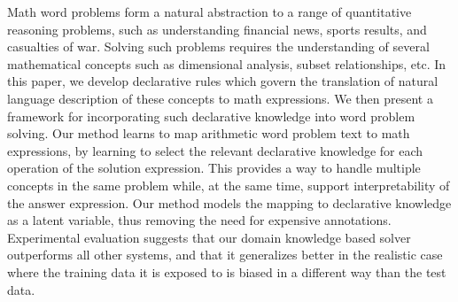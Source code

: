 Math word problems form a natural abstraction to a range of quantitative reasoning problems, such as understanding financial news, sports results, and casualties of war. Solving such problems requires the understanding of several mathematical concepts such as dimensional analysis, subset relationships, etc. In this paper, we develop declarative rules which govern the translation of natural language description of these concepts to math expressions. We then present a framework for incorporating such declarative knowledge into word problem solving. Our method learns to map arithmetic word problem text to math expressions, by learning to select the relevant declarative knowledge for each operation of the solution expression. This provides a way to handle multiple concepts in the same problem while, at the same time, support interpretability of the answer expression. Our method models the mapping to declarative knowledge as a latent variable, thus removing the need for expensive annotations. Experimental evaluation suggests that our domain knowledge based solver outperforms all other systems, and that it generalizes better in the realistic case where the training data it is exposed to is biased in a different way than the test data.
